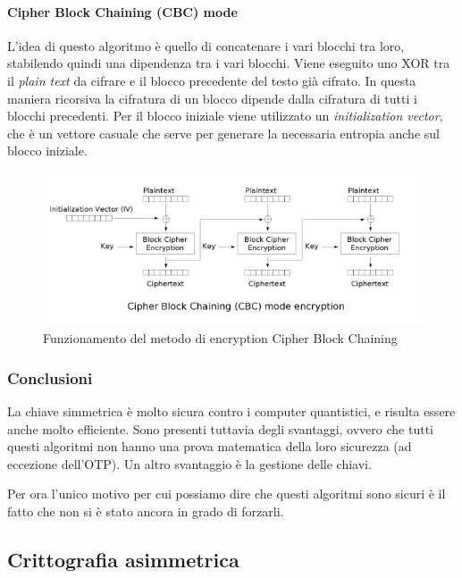 \paragraph{Cipher Block Chaining (CBC) mode}

L'idea di questo algoritmo è quello di concatenare i vari blocchi tra loro,
stabilendo quindi una dipendenza tra i vari blocchi. Viene eseguito uno XOR tra
il \textit{plain text} da cifrare e il blocco precedente del testo già cifrato.
In questa maniera ricorsiva la cifratura di un blocco dipende dalla cifratura di
tutti i blocchi precedenti. Per il blocco iniziale viene utilizzato un
\textit{initialization vector}, che è un vettore casuale che serve per generare
la necessaria entropia anche sul blocco iniziale.

\begin{figure}[H]
\centering
\includegraphics[scale=0.65]{res/img/cbc.png}
\caption{Funzionamento del metodo di encryption Cipher Block Chaining}
\label{fig:password:cbc}
\end{figure}

\subsubsection{Conclusioni}

La chiave simmetrica è molto sicura contro i computer quantistici, e risulta
essere anche molto efficiente. Sono presenti tuttavia degli svantaggi, ovvero
che tutti questi algoritmi non hanno una prova matematica della loro
sicurezza (ad eccezione dell'OTP). Un altro svantaggio è la gestione delle
chiavi.

Per ora l'unico motivo per cui possiamo dire che questi algoritmi sono sicuri è
il fatto che non si è stato ancora in grado di forzarli.

\subsection{Crittografia asimmetrica}

